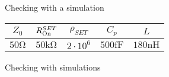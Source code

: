 \documentclass[../main.tex]{subfiles}
\begin{document}
%
%
%
%   

\begin{frame}{Checking with a simulation}
\begin{table}[H]
    \centering
    \begin{tabular}{c|c|c|c|c}
        \(Z_{0}\) & \(R_{\text{On}}^{SET}\) & \(\rho_{SET}\) & \(C_{p}\) & \(L\) \\\hline
        \(50\unit{\ohm}\) & \(50\unit{\kilo\ohm}\) & \(2\cdot10^{6}\) & \(500\unit{\femto\farad}\) & \(180\unit{\nano\henry}\)
    \end{tabular}
\end{table}
\end{frame}

\begin{frame}{Checking with simulations}
\begin{figure}[t]
\centering
  
\end{figure}
\end{frame}

%
\end{document}
